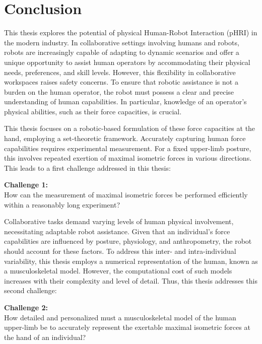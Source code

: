 \chapter*{Conclusion}
\label{chapter:conclusion}
This thesis explores the potential of physical Human-Robot Interaction (pHRI) in the modern industry. In collaborative settings involving humans and robots, robots are increasingly capable of adapting to dynamic scenarios and offer a unique opportunity to assist human operators by accommodating their physical needs, preferences, and skill levels. However, this flexibility in collaborative workspaces raises safety concerns. To ensure that robotic assistance is not a burden on the human operator, the robot must possess a clear and precise understanding of human capabilities. In particular, knowledge of an operator's physical abilities, such as their force capacities, is crucial.

This thesis focuses on a robotic-based formulation of these force capacities at the hand, employing a set-theoretic framework. Accurately capturing human force capabilities requires experimental measurement. For a fixed upper-limb posture, this involves repeated exertion of maximal isometric forces in various directions. This leads to a first challenge addressed in this thesis:
\begin{mdframed}
    \begin{center}
        \textbf{Challenge 1:} \\
        How can the measurement of maximal isometric forces be performed efficiently within a reasonably long experiment?
    \end{center}
\end{mdframed}

Collaborative tasks demand varying levels of human physical involvement, necessitating adaptable robot assistance. Given that an individual's force capabilities are influenced by posture, physiology, and anthropometry, the robot should account for these factors. To address this inter- and intra-individual variability, this thesis employs a numerical representation of the human, known as a musculoskeletal model. However, the computational cost of such models increases with their complexity and level of detail. Thus, this thesis addresses this second challenge:
\begin{mdframed}
    \begin{center}
        \textbf{Challenge 2:} \\
        How detailed and personalized must a musculoskeletal model of the human upper-limb be to accurately represent the exertable maximal isometric forces at the hand of an individual?
    \end{center}
\end{mdframed}   

